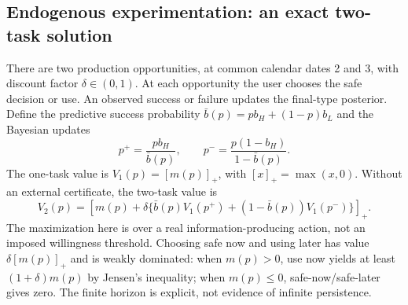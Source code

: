 \documentclass[11pt]{article}
\begin{document}
\subsection{Endogenous experimentation: an exact two-task solution}\label{sec:bellman}
There are two production opportunities, at common calendar dates 2 and 3, with discount factor $\delta\in(0,1)$. At each opportunity the user chooses the safe decision or use. An observed success or failure updates the final-type posterior. Define the predictive success probability $\bar b(p)=pb_H+(1-p)b_L$ and the Bayesian updates
\begin{equation}
 p^+=\frac{pb_H}{\bar b(p)},\qquad
 p^-=\frac{p(1-b_H)}{1-\bar b(p)}.\label{eq:bayes}
\end{equation}
The one-task value is $V_1(p)=[m(p)]_+$, with $[x]_+=\max(x,0)$. Without an external certificate, the two-task value is
\begin{equation}
 V_2(p)=\left[m(p)+\delta\{\bar b(p)V_1(p^+)+(1-\bar b(p))V_1(p^-)\}\right]_+.\label{eq:v2}
\end{equation}
The maximization here is over a real information-producing action, not an imposed willingness threshold. Choosing safe now and using later has value $\delta[m(p)]_+$ and is weakly dominated: when $m(p)>0$, use now yields at least $(1+\delta)m(p)$ by Jensen's inequality; when $m(p)\leq0$, safe-now/safe-later gives zero. The finite horizon is explicit, not evidence of infinite persistence.
\end{document}
